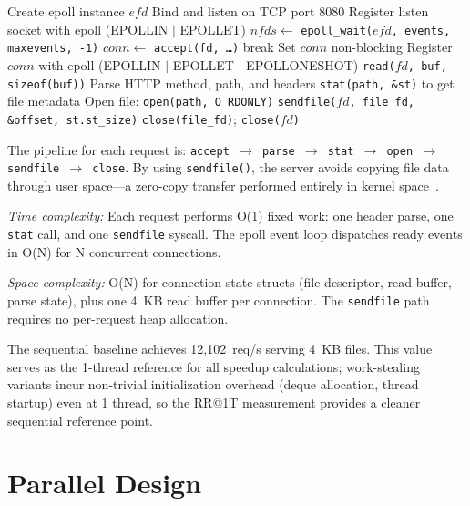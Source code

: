 \documentclass[conference]{IEEEtran}
\begin{document}
\begin{algorithmic}
\STATE Create epoll instance $efd$
\STATE Bind and listen on TCP port 8080
\STATE Register listen socket with epoll (EPOLLIN $|$ EPOLLET)
\LOOP
    \STATE $nfds \gets$ \texttt{epoll\_wait($efd$, events, maxevents, -1)}
                \STATE $conn \gets$ \texttt{accept(fd, \ldots)}
                 \STATE break \ENDIF
                \STATE Set $conn$ non-blocking
                \STATE Register $conn$ with epoll (EPOLLIN $|$ EPOLLET $|$ EPOLLONESHOT)
            \ENDWHILE
        \ELSE
            \STATE \texttt{read($fd$, buf, sizeof(buf))}
            \STATE Parse HTTP method, path, and headers
            \STATE \texttt{stat(path, \&st)} to get file metadata
            \STATE Open file: \texttt{open(path, O\_RDONLY)}
            \STATE \texttt{sendfile($fd$, file\_fd, \&offset, st.st\_size)}
            \STATE \texttt{close(file\_fd)}; \texttt{close($fd$)}
        \ENDIF
    \ENDFOR
\ENDLOOP
\end{algorithmic}

The pipeline for each request is: \texttt{accept $\rightarrow$ parse $\rightarrow$ stat $\rightarrow$ open $\rightarrow$ sendfile $\rightarrow$ close}. By using \texttt{sendfile()}, the server avoids copying file data through user space---a zero-copy transfer performed entirely in kernel space~\cite{b12}.

\textit{Time complexity:} Each request performs O(1) fixed work: one header parse, one \texttt{stat} call, and one \texttt{sendfile} syscall. The epoll event loop dispatches ready events in O(N) for N concurrent connections.

\textit{Space complexity:} O(N) for connection state structs (file descriptor, read buffer, parse state), plus one 4~KB read buffer per connection. The \texttt{sendfile} path requires no per-request heap allocation.

The sequential baseline achieves 12,102~req/s serving 4~KB files. This value serves as the 1-thread reference for all speedup calculations; work-stealing variants incur non-trivial initialization overhead (deque allocation, thread startup) even at 1 thread, so the RR@1T measurement provides a cleaner sequential reference point.

\section{Parallel Design}
\end{document}
